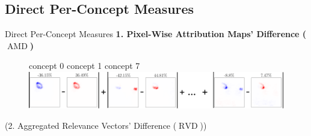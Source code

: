 \documentclass[German, aspectratio=169]{beamer}
\DeclareMathOperator*{\AMD}{AMD}
\DeclareMathOperator*{\RVD}{RVD}
\begin{document}
\subsection{Direct Per-Concept Measures}
\begin{frame}[t]{Direct Per-Concept Measures}
    \textbf{ 1. Pixel-Wise Attribution Maps' Difference ($\AMD$)}
    \vspace{-0.4cm}
    \begin{figure}[t!]
        \centering
        concept 0 \hspace{2.5cm} concept 1 \hspace{3.7cm} concept 7\\
        \includegraphics[width=\textwidth]{images/attr_map_diff.png}
        \label{fig:attr_map_diff}
    \end{figure}
    (2. Aggregated Relevance Vectors' Difference ($\RVD$))
\end{frame}
\end{document}
